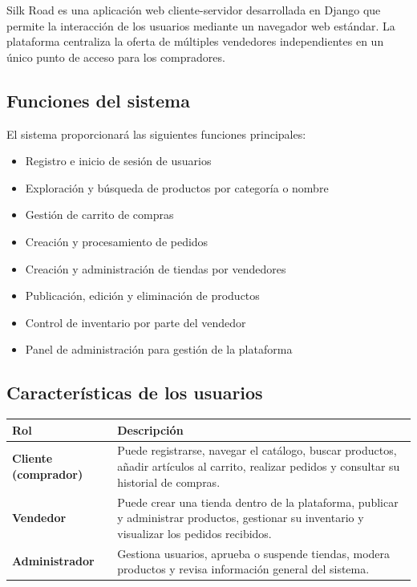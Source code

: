 \documentclass[12pt, letterpaper]{article}
\begin{document}
Silk Road es una aplicación web cliente-servidor desarrollada en Django que permite la interacción de los usuarios mediante un navegador web estándar. La plataforma centraliza la oferta de múltiples vendedores independientes en un único punto de acceso para los compradores.

\newpage
\subsection{Funciones del sistema}

El sistema proporcionará las siguientes funciones principales:

\begin{itemize}
  \item Registro e inicio de sesión de usuarios
  \item Exploración y búsqueda de productos por categoría o nombre
  \item Gestión de carrito de compras
  \item Creación y procesamiento de pedidos
  \item Creación y administración de tiendas por vendedores
  \item Publicación, edición y eliminación de productos
  \item Control de inventario por parte del vendedor
  \item Panel de administración para gestión de la plataforma
\end{itemize}

\subsection{Características de los usuarios}

\begin{tabularx}{\linewidth}{>{\bfseries}lX}
  \toprule
  \rowcolor{primarylight}
  Rol & Descripción \\
  \midrule
  Cliente (comprador)
    & Puede registrarse, navegar el catálogo, buscar productos, añadir artículos al
      carrito, realizar pedidos y consultar su historial de compras. \\
  \rowcolor{rowalt}
  Vendedor
    & Puede crear una tienda dentro de la plataforma, publicar y administrar
      productos, gestionar su inventario y visualizar los pedidos recibidos. \\
  Administrador
    & Gestiona usuarios, aprueba o suspende tiendas, modera productos y revisa
      información general del sistema. \\
  \bottomrule
\end{tabularx}
\end{document}

